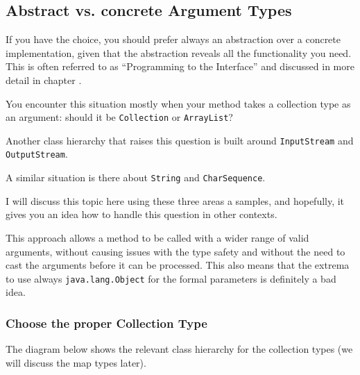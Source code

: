 \subsection{Abstract vs. concrete Argument Types}\label{sec:ArgumentTypes}
If you have the choice, you should prefer always an abstraction over a concrete implementation, given that the abstraction reveals all the functionality you need. This is often referred to as “Programming to the Interface” and discussed in more detail in chapter .

You encounter this situation mostly when your method takes a collection type as an argument: should it be \lstinline|Collection|\autocite{ORACLE_DOC_COLLECTION_INTERFACE} or \lstinline|ArrayList|\autocite{ORACLE_DOC_ARRAYLIST_CLASS}?

Another class hierarchy that raises this question is built around \lstinline|InputStream|\autocite{ORACLE_DOC_INPUTSTREAM_CLASS} and \lstinline|OutputStream|\autocite{ORACLE_DOC_OUTPUTSTREAM_CLASS}.

A similar situation is there about \lstinline|String|\autocite{ORACLE_DOC_STRING_CLASS} and \lstinline|CharSequence|\autocite{ORACLE_DOC_CHARSEQUENCE_INTERFACE}.

I will discuss this topic here using these three areas a samples, and hopefully, it gives you an idea how to handle this question in other contexts.

This approach allows a method to be called with a wider range of valid arguments, without causing issues with the type safety and without the need to cast the arguments before it can be processed. This also means that the extrema to use always \lstinline|java.lang.Object|\autocite{ORACLE_DOC_OBJECT_CLASS} for the formal parameters is definitely a bad idea.


\subsubsection{Choose the proper Collection Type}\label{sec:ChooseTheProperCollectionType}
The diagram below shows the relevant class hierarchy for the collection types (we will discuss the map types later).

